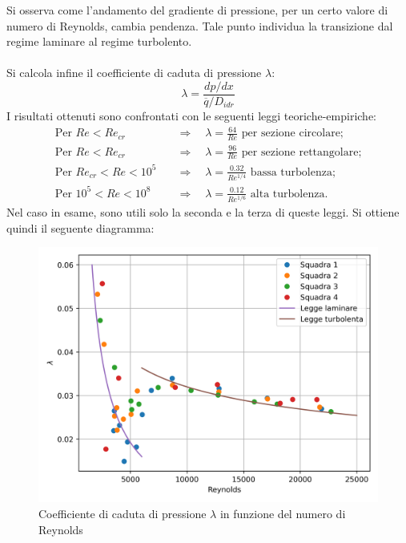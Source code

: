 \noindent Si osserva come l'andamento del gradiente di pressione, per un certo valore di numero di Reynolds, cambia pendenza. Tale punto individua la transizione dal regime laminare al regime turbolento.\\\\
Si calcola infine il coefficiente di caduta di pressione $\lambda$:
\begin{equation*}
    \lambda = \frac{dp/dx}{\overline q/D_{idr}}
\end{equation*}
I risultati ottenuti sono confrontati con le seguenti leggi teoriche-empiriche:
\begin{equation*}
    \begin{split}
        \text{Per } Re < Re_{cr} \quad &\Rightarrow \quad \lambda = \frac{64}{Re} \text{ per sezione circolare;}\\
        \text{Per } Re < Re_{cr} \quad &\Rightarrow \quad \lambda = \frac{96}{Re} \text{ per sezione rettangolare;}\\
        \text{Per } Re_{cr} < Re < 10^5 \quad &\Rightarrow \quad \lambda = \frac{0.32}{Re^{1/4}} \text{ bassa turbolenza;}\\
        \text{Per } 10^5 < Re < 10^8 \quad &\Rightarrow \quad \lambda = \frac{0.12}{Re^{1/6}} \text{ alta turbolenza.}
    \end{split}
\end{equation*}
Nel caso in esame, sono utili solo la seconda e la terza di queste leggi. Si ottiene quindi il seguente diagramma:
\begin{figure}[H]
    \centering
    \includegraphics[width=.92\textwidth]{images/7/lambda.png}
    \caption{Coefficiente di caduta di pressione $\lambda$ in funzione del numero di Reynolds}
\end{figure}

